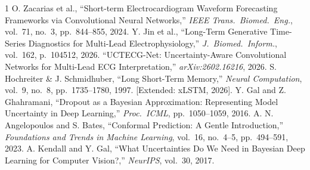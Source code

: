 \documentclass[10pt,journal,compsoc]{IEEEtran}
\begin{document}
\begin{thebibliography}{1}
 O. Zacarias et al., ``Short-term Electrocardiogram Waveform Forecasting Frameworks via Convolutional Neural Networks,'' \emph{IEEE Trans.\ Biomed.\ Eng.}, vol.~71, no.~3, pp.~844--855, 2024.
 Y. Jin et al., ``Long-Term Generative Time-Series Diagnostics for Multi-Lead Electrophysiology,'' \emph{J.\ Biomed.\ Inform.}, vol.~162, p.~104512, 2026.
 ``UCTECG-Net: Uncertainty-Aware Convolutional Networks for Multi-Lead ECG Interpretation,'' \emph{arXiv:2602.16216}, 2026.
 S. Hochreiter \& J. Schmidhuber, ``Long Short-Term Memory,'' \emph{Neural Computation}, vol.~9, no.~8, pp.~1735--1780, 1997. [Extended: xLSTM, 2026].
 Y. Gal and Z. Ghahramani, ``Dropout as a Bayesian Approximation: Representing Model Uncertainty in Deep Learning,'' \emph{Proc.\ ICML}, pp.~1050--1059, 2016.
 A. N. Angelopoulos and S. Bates, ``Conformal Prediction: A Gentle Introduction,'' \emph{Foundations and Trends in Machine Learning}, vol.~16, no.~4--5, pp.~494--591, 2023.
 A. Kendall and Y. Gal, ``What Uncertainties Do We Need in Bayesian Deep Learning for Computer Vision?,'' \emph{NeurIPS}, vol.~30, 2017.
\end{thebibliography}
\end{document}
